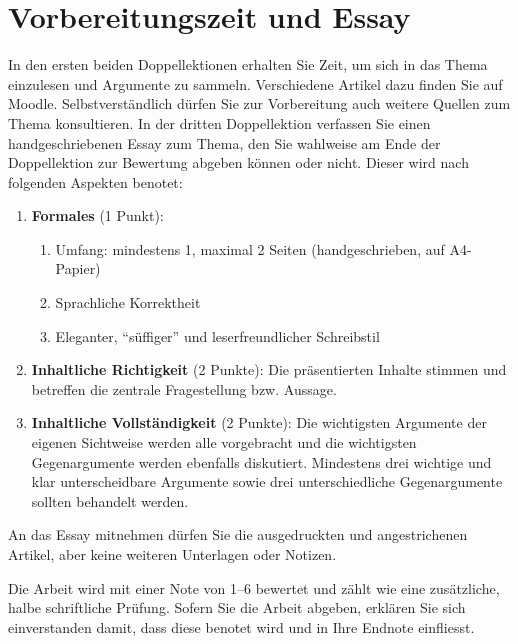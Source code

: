 \section{Vorbereitungszeit und Essay}

In den ersten beiden Doppellektionen erhalten Sie Zeit, um sich in das Thema einzulesen und Argumente zu sammeln. Verschiedene Artikel dazu finden Sie auf Moodle. Selbstverständlich dürfen Sie zur Vorbereitung auch weitere Quellen zum Thema konsultieren. In der dritten Doppellektion verfassen Sie einen handgeschriebenen Essay zum Thema, den Sie wahlweise am Ende der Doppellektion zur Bewertung abgeben können oder nicht. Dieser wird nach folgenden Aspekten benotet:

\begin{enumerate}
\item \textbf{Formales} (1 Punkt):
\begin{enumerate}
\item Umfang: mindestens 1, maximal 2 Seiten (handgeschrieben, auf A4-Papier)
\item Sprachliche Korrektheit
\item Eleganter, \enquote{süffiger} und leserfreundlicher Schreibstil
\end{enumerate}
\item \textbf{Inhaltliche Richtigkeit} (2 Punkte): Die präsentierten Inhalte stimmen und betreffen die zentrale Fragestellung bzw. Aussage.
\item \textbf{Inhaltliche Vollständigkeit} (2 Punkte): Die wichtigsten Argumente der eigenen Sichtweise werden alle vorgebracht und die wichtigsten Gegenargumente werden ebenfalls diskutiert. Mindestens drei wichtige und klar unterscheidbare Argumente sowie drei unterschiedliche Gegenargumente sollten behandelt werden.
\end{enumerate}

An das Essay mitnehmen dürfen Sie die ausgedruckten und angestrichenen Artikel, aber keine weiteren Unterlagen oder Notizen.

Die Arbeit wird mit einer Note von 1--6 bewertet und zählt wie eine zusätzliche, halbe schriftliche Prüfung. Sofern Sie die Arbeit abgeben, erklären Sie sich einverstanden damit, dass diese benotet wird und in Ihre Endnote einfliesst.
